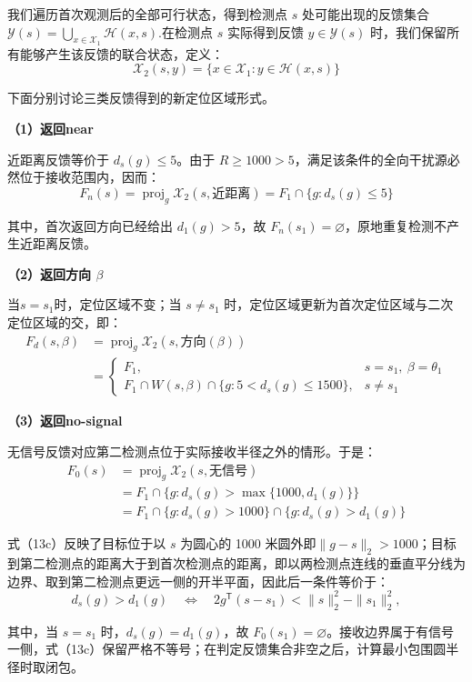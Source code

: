 我们遍历首次观测后的全部可行状态，得到检测点 \(s\) 处可能出现的反馈集合\(\mathcal Y(s)=\bigcup_{x\in\mathcal X_1}\mathcal H(x,s).\)在检测点 \(s\) 实际得到反馈 \(y\in\mathcal Y(s)\) 时，我们保留所有能够产生该反馈的联合状态，定义：
\[
\mathcal X_2(s,y)
=\{x\in\mathcal X_1:y\in\mathcal H(x,s)\}
\tag{12}
\]

下面分别讨论三类反馈得到的新定位区域形式。

\textbf{（1）返回near}

近距离反馈等价于 \(d_s(g)\le5\)。由于 \(R\ge1000>5\)，满足该条件的全向干扰源必然位于接收范围内，因而：
\[
F_n(s)
=\operatorname{proj}_g\mathcal X_2(s,\text{近距离})
=F_1\cap\{g:d_s(g)\le5\}
\tag{13a}
\]

其中，首次返回方向已经给出 \(d_1(g)>5\)，故 \(F_n(s_1)=\varnothing\)，原地重复检测不产生近距离反馈。

\textbf{（2）返回方向 \(\beta\)}

当\(s=s_1\)时，定位区域不变；当 \(s\ne s_1\) 时，定位区域更新为首次定位区域与二次定位区域的交，即：
\[
\begin{aligned}
F_d(s,\beta)
&=\operatorname{proj}_g\mathcal X_2(s,\text{方向}(\beta))\\
&=\begin{cases}
F_1,&s=s_1,\ \beta=\theta_1\\[1mm]
F_1\cap W(s,\beta)\cap\{g:5<d_s(g)\le1500\},&s\ne s_1
\end{cases}
\end{aligned}
\tag{13b}
\]

\textbf{（3）返回no-signal}

无信号反馈对应第二检测点位于实际接收半径之外的情形。于是：
\[
\begin{aligned}
F_0(s)
&=\operatorname{proj}_g\mathcal X_2(s,\text{无信号})\\
&=F_1\cap\{g:d_s(g)>\max\{1000,d_1(g)\}\}\\
&=F_1\cap\{g:d_s(g)>1000\}\cap\{g:d_s(g)>d_1(g)\}
\end{aligned}
\tag{13c}
\]

式（13c）反映了目标位于以 \(s\) 为圆心的 1000 米圆外即\(\|g-s\|_2 > 1000\)；目标到第二检测点的距离大于到首次检测点的距离，即以两检测点连线的垂直平分线为边界、取到第二检测点更远一侧的开半平面，因此后一条件等价于：
\[
d_s(g)>d_1(g)
\quad\Longleftrightarrow\quad
2g^{\mathsf T}(s-s_1)<\|s\|_2^2-\|s_1\|_2^2,
\]

其中，当 \(s=s_1\) 时，\(d_s(g)=d_1(g)\)，故 \(F_0(s_1)=\varnothing\)。接收边界属于有信号一侧，式（13c）保留严格不等号；在判定反馈集合非空之后，计算最小包围圆半径时取闭包。


